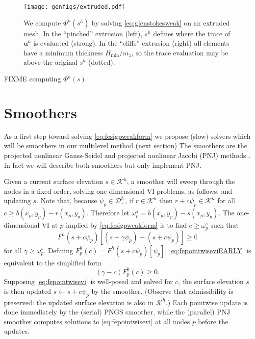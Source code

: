 \documentclass[letterpaper,final,12pt,reqno]{amsart}
\theoremstyle{claim}
\newcommand{\bu}{\mathbf{u}}
\numberwithin{equation}{section}
\numberwithin{figure}{section}
\numberwithin{table}{section}
\numberwithin{theorem}{section}
\begin{document}
\begin{figure}[t]
\begin{center}
\texttt{[image: genfigs/extruded.pdf]}
\end{center}
\caption{We compute $\Phi^h(s^h)$ by solving \eqref{eq:glenstokesweak} on an extruded mesh.  In the ``pinched'' extrusion (left), $s^h$ defines where the trace of $\bu^h$ is evaluated (strong).  In the ``cliffs'' extrusion (right) all elements have a minimum thickness $H_{\text{min}} / m_z$, so the trace evaluation may be above the original $s^h$ (dotted).}
\label{fig:extruded}
\end{figure}

FIXME computing $\Phi^h(s)$


\section{Smoothers} \label{sec:smoothers}

As a first step toward solving \eqref{eq:fesigpweakform} we propose (slow) solvers which will be smoothers in our multilevel method (next section)  The smoothers are the projected nonlinear Gauss-Seidel and projected nonlinear Jacobi (PNJ) methods \cite{KinderlehrerStampacchia1980}.  In fact we will describe both smoothers but only implement PNJ.

Given a current surface elevation $s\in \mathcal{K}^h$, a smoother will sweep through the nodes in a fixed order, solving one-dimensional VI problems, as follows, and updating $s$.   Note that, because $\psi_p \in \mathcal{D}_+^h$, if $r \in \mathcal{K}^h$ then $r + c \psi_p \in \mathcal{K}^h$ for all $c\ge b(x_p,y_p) - r(x_p,y_p)$.  Therefore let $\omega_p^s = b(x_p,y_p) - s(x_p,y_p)$.  The one-dimensional VI at $p$ implied by \eqref{eq:fesigpweakform} is to find $c \ge \omega_p^s$ such that
\begin{equation}
F^h(s+c\psi_p)[(s+\gamma \psi_p) - (s+c \psi_p)] \ge 0 \label{eq:fepointwiseviEARLY}
\end{equation}
for all $\gamma \ge \omega_p^s$.  Defining $F_p^h(c) = F^h(s+c\psi_p)[\psi_p]$, \eqref{eq:fepointwiseviEARLY} is equivalent to the simplified form
\begin{equation}
(\gamma - c) F_p^h(c) \ge 0. \label{eq:fepointwisevi}
\end{equation}
Supposing \eqref{eq:fepointwisevi} is well-posed and solved for $c$, the surface elevation $s$ is then updated $s \gets s + c \psi_p$ by the smoother.  (Observe that admissibility is preserved: the updated surface elevation is also in $\mathcal{K}^h$.)  Each pointwise update is done immediately by the (serial) PNGS smoother, while the (parallel) PNJ smoother computes solutions to \eqref{eq:fepointwisevi} at all nodes $p$ before the updates.
\end{document}

